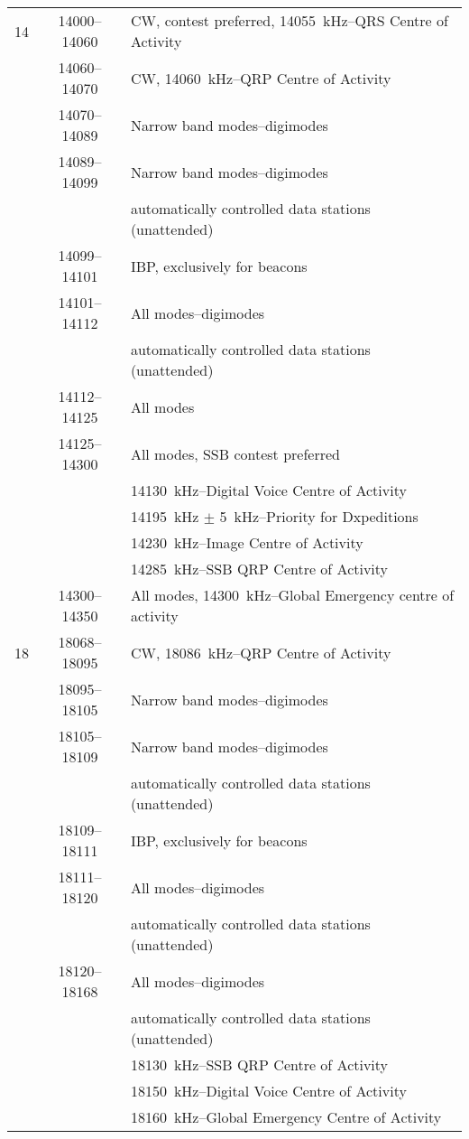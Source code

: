 \begin{longtable}{lcl}
14   & 14000--14060 & CW, contest preferred, 14055~kHz--QRS Centre of Activity\\
     & 14060--14070 & CW, 14060~kHz--QRP Centre of Activity\\
     & 14070--14089 & Narrow band modes--digimodes\\
     & 14089--14099 & Narrow band modes--digimodes\\
     & & automatically controlled data stations (unattended)\\
     & 14099--14101 & IBP, exclusively for beacons\\
     & 14101--14112 & All modes--digimodes\\
     & & automatically controlled data stations (unattended)\\
     & 14112--14125 & All modes\\
     & 14125--14300 & All modes, SSB contest preferred\\
     & & 14130~kHz--Digital Voice Centre of Activity\\
     & & 14195~kHz \(\pm\) 5~kHz--Priority for Dxpeditions\\
     & & 14230~kHz--Image Centre of Activity\\
     & & 14285~kHz--SSB QRP Centre of Activity\\
     & 14300--14350 & All modes, 14300~kHz--Global Emergency centre of activity\\

18   & 18068--18095 & CW, 18086~kHz--QRP Centre of Activity\\
     & 18095--18105 & Narrow band modes--digimodes\\
     & 18105--18109 & Narrow band modes--digimodes\\
     & & automatically controlled data stations (unattended)\\
     & 18109--18111 & IBP, exclusively for beacons\\
     & 18111--18120 & All modes--digimodes\\
     & & automatically controlled data stations (unattended)\\
     & 18120--18168 & All modes--digimodes\\
     & & automatically controlled data stations (unattended)\\
     & & 18130~kHz--SSB QRP Centre of Activity\\
     & & 18150~kHz--Digital Voice Centre of Activity\\
     & & 18160~kHz--Global Emergency Centre of Activity\\


\end{longtable}
